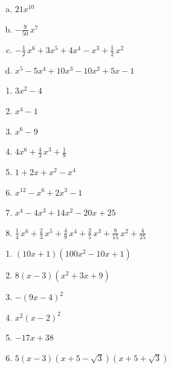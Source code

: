 \documentclass{ximera}
\begin{document}
\begin{Antwoord} \label{antw4.1}
\begin{enumerate}[(a)]
\item
\hyperlink{oef4.1}{$21x^{10}$}
\item
\hyperlink{oef4.1}{$-\frac{9}{50}\,x^7$}
\item
\hyperlink{oef4.1}{$-\frac{1}{2}\,x^6 + 3x^5 + 4x^4 - x^3 + \frac{1}{2}\,x^2$}
\item
\hyperlink{oef4.1}{$x^5 - 5x^4 + 10x^3 - 10x^2 + 5x - 1$}
\end{enumerate}
\end{Antwoord}

\begin{Antwoord} \label{antw4.2}
\begin{enumerate}
\item
\hyperlink{oef4.2}{$3x^2 - 4$}
\item
\hyperlink{oef4.2}{$x^4-1$}
\item
\hyperlink{oef4.2}{$x^6-9$}
\item
\hyperlink{oef4.2}{$4x^6 + \frac{4}{3}\,x^3+\frac{1}{9}$}
\item
\hyperlink{oef4.2}{$1 + 2x + x^2 - x^4$}
\item
\hyperlink{oef4.2}{$x^{12}-x^6+2x^3 - 1$}
\item
\hyperlink{oef4.2}{$x^4 - 4x^3 + 14x^2 - 20x + 25$}
\item
\hyperlink{oef4.2}{$\frac{1}{4}\,x^6 + \frac{2}{3}\,x^5 + \frac{4}{9}\,x^4 + \frac{2}{5}\,x^3 + \frac{8}{15}\,x^2 + \frac{4}{25}$}
\end{enumerate}
\end{Antwoord}

\begin{Antwoord} \label{antw4.3}
\begin{enumerate}
\item
\hyperlink{oef4.3}{$(10x+1)(100x^2 - 10x + 1)$}
\item
\hyperlink{oef4.3}{$8(x-3)(x^2 + 3x + 9)$}
\item
\hyperlink{oef4.3}{$-(9x-4)^2$}
\item
\hyperlink{oef4.3}{$x^2(x-2)^2$}
\item
\hyperlink{oef4.3}{$-17x+38$}
\item
\hyperlink{oef4.3}{$5(x-3)(x+5-\sqrt{3})(x+5+\sqrt{3})$}
\end{enumerate}
\end{Antwoord}
\end{document}
